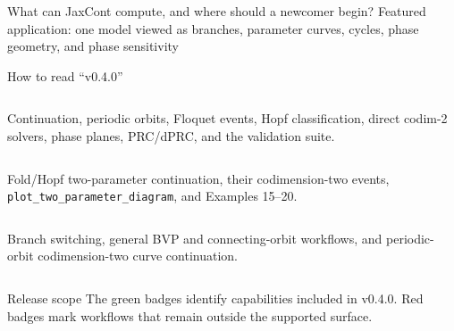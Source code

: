   {What can JaxCont compute, and where should a newcomer begin?}
  {Featured application: one model viewed as branches, parameter curves, cycles, phase geometry, and phase sensitivity}

\begin{frame}{How to read ``v0.4.0''}
\small
\begin{columns}[T,onlytextwidth]
\releasedbadge
{}
Continuation, periodic orbits, Floquet events, Hopf classification, direct
codim-2 solvers, phase planes, PRC/dPRC, and the validation suite.
\end{columns}

\vspace{4mm}
\begin{columns}[T,onlytextwidth]
\releasedbadge
{}
Fold/Hopf two-parameter continuation, their codimension-two events,
\texttt{plot\_two\_parameter\_diagram}, and Examples 15--20.
\end{columns}

\vspace{4mm}
\begin{columns}[T,onlytextwidth]
\futurebadge
{}
Branch switching, general BVP and connecting-orbit workflows, and
periodic-orbit codimension-two curve continuation.
\end{columns}

\vfill
\begin{alertblock}{Release scope}
The green badges identify capabilities included in v0.4.0. Red badges mark
workflows that remain outside the supported surface.
\end{alertblock}
\end{frame}

